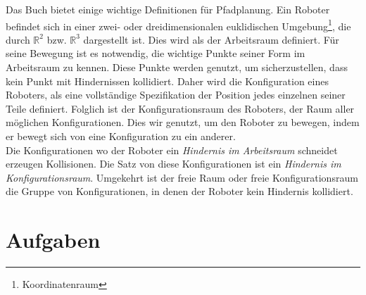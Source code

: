 %
%
%
Das Buch \cite{Principles:05} bietet einige wichtige Definitionen für Pfadplanung. Ein Roboter befindet sich in einer zwei- oder dreidimensionalen euklidischen Umgebung\footnote{Koordinatenraum}, die durch $\mathbb{R}^{2}$ bzw. $\mathbb{R}^{3}$ dargestellt ist. Dies wird als der Arbeitsraum definiert. Für seine Bewegung ist es notwendig, die wichtige Punkte seiner Form im Arbeitsraum zu kennen. Diese Punkte werden genutzt, um sicherzustellen, dass kein Punkt mit Hindernissen kollidiert. Daher wird die Konfiguration eines Roboters, als eine vollständige Spezifikation der Position jedes einzelnen seiner Teile definiert. Folglich ist der Konfigurationsraum des Roboters, der Raum aller möglichen Konfigurationen. Dies wir genutzt, um den Roboter zu bewegen, indem er bewegt sich von eine Konfiguration zu ein anderer.\\
Die Konfigurationen wo der Roboter ein \textit{Hindernis im Arbeitsraum} schneidet erzeugen Kollisionen. Die Satz von diese Konfigurationen ist ein \textit{Hindernis im Konfigurationsraum}. 
Umgekehrt ist der freie Raum oder freie Konfigurationsraum die Gruppe von Konfigurationen, in denen der Roboter kein Hindernis kollidiert.


\section{Aufgaben} \label{AufgabenPP}


